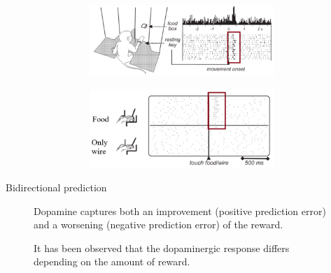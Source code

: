 \begin{description}
\begin{description}
\begin{casestudy}
                    \begin{figure}[H]
                        \centering
                        \begin{subfigure}{0.48\linewidth}
                            \centering
                            \includegraphics[width=0.9\linewidth]{../module1/img/dopamine_monkey1.png}
                        \end{subfigure}
                        \begin{subfigure}{0.48\linewidth}
                            \centering
                            \includegraphics[width=0.9\linewidth]{../module1/img/dopamine_monkey2.png}
                        \end{subfigure}
                    \end{figure}
                \end{casestudy}
            

            \item[Bidirectional prediction] 
                Dopamine captures both an improvement (positive prediction error) and a worsening (negative prediction error) of the reward.

                \begin{casestudy}
                    It has been observed that the dopaminergic response differs depending on the amount of reward.


\end{casestudy}
\end{description}
\end{description}
